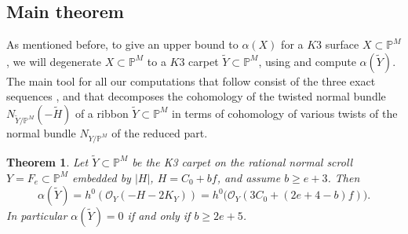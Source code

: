 \documentclass[11pt,twoside]{amsart}
\theoremstyle{plain}
\newtheorem{theorem}{Theorem}[section]
\theoremstyle{definition}
\newtheorem{remark}[theorem]{Remark}
\newcommand{\PM}{\mathbb{P}^M}
\newcommand{\OO}{\mathcal{O}}
\newcommand{\Yt}{\widetilde{Y}}
\begin{document}
\subsection{Main theorem}

As mentioned before, to give an upper bound to $\alpha(X)$ for a $K3$ surface $X \subset \mathbb{P}^M$, we will degenerate $X \subset \mathbb{P}^M$ to a $K3$ carpet $\widetilde{Y} \subset \mathbb{P}^M$, using  and compute $\alpha(\widetilde{Y})$.  The main tool for all our computations that follow consist of the three exact sequences ,  and   that decomposes the cohomology of the twisted normal bundle $N_{\widetilde{Y}/\mathbb{P}^M}(-\widetilde{H})$ of a ribbon $\widetilde{Y} \subset \mathbb{P}^M$ in terms of cohomology of various twists of the normal bundle $N_{Y/\mathbb{P}^M}$ of the reduced part. \\

\begin{theorem}\label{thm:alpha}
Let $\Yt\subset\PM$ be the K3 carpet on the rational normal scroll $Y=F_e\subset\PM$ embedded by $|H|$, $H=C_0+bf$, and assume $b\ge e+3$. Then
\[
\alpha(\Yt)=h^0(\OO_Y(-H-2K_Y))=h^0\big(\OO_Y(3C_0+(2e+4-b)f)\big).
\]
In particular $\alpha(\Yt)=0$ if and only if $b\ge 2e+5$.
\end{theorem}

\end{document}
